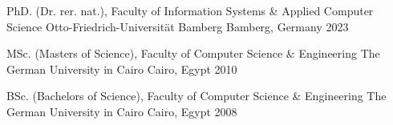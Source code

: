 

\begin{cventries}

  \cventry
    {PhD. (Dr. rer. nat.), Faculty of Information Systems \& Applied Computer Science} %
    {Otto-Friedrich-Universit\"{a}t Bamberg} %
    {Bamberg, Germany} %
    {2023} %
    {
    }

  \cventry
    {MSc. (Masters of Science), Faculty of Computer Science \& Engineering} %
    {The German University in Cairo} %
    {Cairo, Egypt} %
    {2010} %
    {
    }

  \cventry
    {BSc. (Bachelors of Science), Faculty of Computer Science \& Engineering} %
    {The German University in Cairo} %
    {Cairo, Egypt} %
    {2008} %
    {
    }


\end{cventries}
